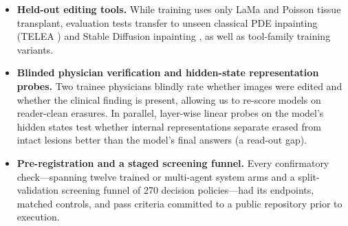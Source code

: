 \documentclass[5p,times,twocolumn,authoryear]{elsarticle}
\begin{document}
\begin{itemize}[leftmargin=*,nosep]
    \item \textbf{Held-out editing tools.} While training uses only LaMa and Poisson tissue transplant, evaluation tests transfer to unseen classical PDE inpainting (TELEA \citep{telea2004image}) and Stable Diffusion inpainting \citep{rombach2022high}, as well as tool-family training variants.
    \item \textbf{Blinded physician verification and hidden-state representation probes.} Two trainee physicians blindly rate whether images were edited and whether the clinical finding is present, allowing us to re-score models on reader-clean erasures. In parallel, layer-wise linear probes \citep{alain2016understanding} on the model's hidden states test whether internal representations separate erased from intact lesions better than the model's final answers (a read-out gap).
    \item \textbf{Pre-registration and a staged screening funnel.} Every confirmatory check---spanning twelve trained or multi-agent system arms and a split-validation screening funnel of 270 decision policies---had its endpoints, matched controls, and pass criteria committed to a public repository prior to execution.
\end{itemize}
\end{document}
